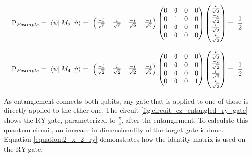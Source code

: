 \begin{equation}
    \centering
    \begin{split}
        \mathrm{P}_{Example} =\ \bra{\psi}M_2\ket{\psi} =\ \begin{pmatrix}
        \frac{-i}{\sqrt{2}} & \frac{i}{\sqrt{2}} & \frac{-i}{\sqrt{2}} & \frac{-i}{\sqrt{2}}
        \end{pmatrix}\begin{pmatrix}
        0 & 0 & 0 & 0 \\ 
        0 & 1 & 0 & 0 \\ 
        0 & 0 & 0 & 0\\ 
        0 & 0 & 0& 0\end{pmatrix}\begin{pmatrix}
        \frac{i}{\sqrt{2}} \\ \frac{-i}{\sqrt{2}} \\ \frac{i}{\sqrt{2}} \\ \frac{i}{\sqrt{2}}
        \end{pmatrix} =\ \frac{1}{2}
    \end{split}
    \label{equation:probability_calculation_example_1}
\end{equation}

\begin{equation}
    \centering
    \begin{split}
        \mathrm{P}_{Example} =\ \bra{\psi}M_4\ket{\psi} =\ \begin{pmatrix}
        \frac{-i}{\sqrt{2}} & \frac{i}{\sqrt{2}} & \frac{-i}{\sqrt{2}} & \frac{-i}{\sqrt{2}}
        \end{pmatrix}\begin{pmatrix}
        0 & 0 & 0 & 0 \\ 
        0 & 0 & 0 & 0 \\ 
        0 & 0 & 0 & 0\\ 
        0 & 0 & 0& 1\end{pmatrix}\begin{pmatrix}
        \frac{i}{\sqrt{2}} \\ \frac{-i}{\sqrt{2}} \\ \frac{i}{\sqrt{2}} \\ \frac{i}{\sqrt{2}}
        \end{pmatrix} =\ \frac{1}{2}
    \end{split}
    \label{equation:probability_calculation_example_2}
\end{equation}

As entanglement connects both qubits, any gate that is applied to one of those is directly applied to the other one. The circuit \ref{fig:circuit_cz_entangled_ry_gate} shows the $\mathrm{RY}$ gate, parameterized to $\frac{\pi}{4}$,  after the entanglement. To calculate this quantum circuit, an increase in dimensionality of the target gate is done. Equation \ref{equation:2_x_2_ry} demonstrates how the identity matrix is used on the $\mathrm{RY}$ gate.

